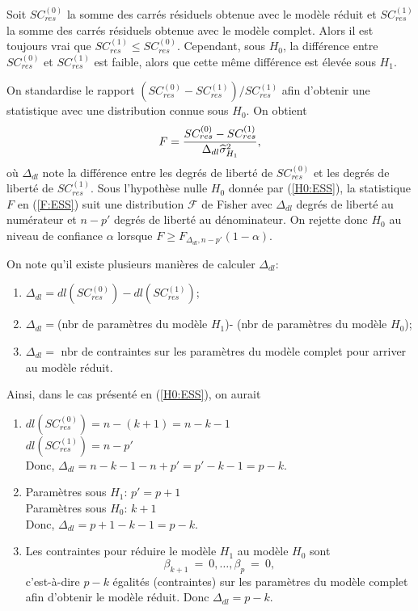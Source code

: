 Soit $SC_{res}^{(0)}$ la somme des carrés résiduels obtenue avec
le modèle réduit et $SC_{res}^{(1)}$ la somme des carrés résiduels obtenue avec le
modèle complet. Alors il est toujours vrai que $SC_{res}^{(1)}\le SC_{res}^{(0)}$. Cependant, sous $H_0$,
la différence entre $SC_{res}^{(0)}$ et $SC_{res}^{(1)}$ est faible, alors que cette même
différence est élevée sous $H_1$.

On standardise le rapport
$(SC_{res}^{(0)}-SC_{res}^{(1)})/SC_{res}^{(1)}$ afin d'obtenir une statistique avec une distribution connue sous $H_0$. On obtient
\begin{equation}\label{F:ESS}
F={SC_{res}^{(0)}-SC_{res}^{(1)}\over
\Delta_{dl}\widehat\sigma^2_{H_1}},
\end{equation}
où $\Delta_{dl}$ note la différence entre les degrés de liberté de
$SC_{res}^{(0)}$ et les degrés de liberté de $SC_{res}^{(1)}$. Sous l'hypothèse nulle $H_0$ donnée par
(\ref{H0:ESS}), la statistique $F$ en (\ref{F:ESS}) suit une distribution $\mathcal F$ de Fisher avec $\Delta_{dl}$ degrés de
liberté au numérateur et $n-p'$ degrés de liberté au dénominateur. On rejette donc $H_0$ au
niveau de confiance $\alpha$ lorsque $F\ge F_{\Delta_{dl},n-p'}(1-\alpha)$.


On note qu'il existe plusieurs manières de calculer $\Delta_{dl}$:
\begin{enumerate}\item
$\Delta_{dl}=dl(SC_{res}^{(0)})-dl(SC_{res}^{(1)})$;
\item $\Delta_{dl}=$(nbr de paramètres du mod\`ele $H_1$)-
(nbr de paramètres du modèle $H_0$);
\item $\Delta_{dl}=$ nbr de contraintes sur les param\`etres du mod\`ele complet pour
arriver au mod\`ele réduit.
\end{enumerate}
Ainsi, dans le cas présenté en (\ref{H0:ESS}), on aurait
\begin{enumerate}
\item $dl(SC_{res}^{(0)})=n-(k+1)=n-k-1$\\
$dl(SC_{res}^{(1)})=n-p'$\\
Donc, $\Delta_{dl}=n-k-1-n+p'=p'-k-1=p-k$.
\item Param\`etres sous $H_1$: $p'=p+1$\\
Param\`etres sous $H_0$: $k+1$\\
Donc, $\Delta_{dl}=p+1-k-1=p-k$.
\item Les contraintes pour réduire le mod\`ele $H_1$ au mod\`ele $H_0$ sont
$$\beta_{k+1}~=~0,\ldots, \beta_{p}~=~0,$$ c'est-à-dire $p-k$ égalités (contraintes) sur les param\`etres du mod\`ele complet afin d'obtenir le mod\`ele réduit. Donc $\Delta_{dl}=p-k$.
\end{enumerate}

